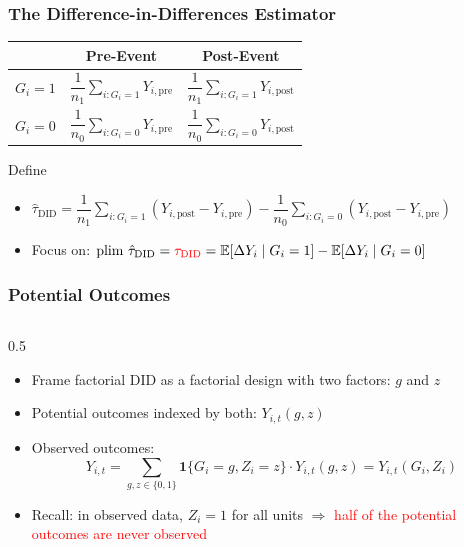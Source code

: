 \documentclass[xcolor=svgnames,9pt,english, aspectratio=169]{beamer}
\newcommand{\red}{\textcolor{red}}
\newcommand{\E}{\ensuremath{\mathbb{E}}}
\newcommand{\tdid}{\ensuremath{\tau_{\mathrm{DID}}}}
\newcommand{\tdidhat}{\ensuremath{\hat{\tau}_{\mathrm{DID}}}}
\newcommand{\pre}{\mathrm{pre}}
\newcommand{\post}{\mathrm{post}}
\newcommand{\potree}[1]{%
\begin{tikzpicture}[x=1cm,y=1cm, font=\footnotesize]
\node[font=\footnotesize\bfseries] at (3.35,3.0) {Pre-Event};
\node[font=\footnotesize\bfseries] at (5.15,3.0) {Post-Event};
\node (root) at (0.1,0) {Unit $i$};
\draw[densely dotted, thick] (0.55,0.15) -- (1.55,1.65);
\draw[densely dotted, thick] (0.55,-0.15) -- (1.55,-1.65);
\node at (0.72,1.22)  {$g=1$};
\node at (0.72,-1.22) {$g=0$};
\draw[densely dotted, thick] (1.6,1.75) -- (2.45,2.3);
\draw[densely dotted, thick] (1.6,1.75) -- (2.45,1.15);
\draw[densely dotted, thick] (1.6,-1.75) -- (2.45,-1.2);
\draw[densely dotted, thick] (1.6,-1.75) -- (2.45,-2.35);
\node at (1.95,2.25)  {$z=1$};
\node at (1.95,1.15)  {$z=0$};
\node at (1.95,-1.2)  {$z=1$};
\node at (1.95,-2.35) {$z=0$};
\node at (3.35,2.35)  {$Y_{i,\pre}(1,1)$};
\node[red] at (3.35,1.15)  {$Y_{i,\pre}(1,0)$};
\node at (3.35,-1.2)  {$Y_{i,\pre}(0,1)$};
\node[red] at (3.35,-2.35) {$Y_{i,\pre}(0,0)$};
\node at (5.15,2.35)  {$Y_{i,\post}(1,1)$};
\node[red] at (5.15,1.15)  {$Y_{i,\post}(1,0)$};
\node at (5.15,-1.2)  {$Y_{i,\post}(0,1)$};
\node[red] at (5.15,-2.35) {$Y_{i,\post}(0,0)$};
\if#11
\draw[decorate,decoration={brace,amplitude=4pt}] (5.95,2.5) -- (5.95,1.0)
  node[midway,right=5pt] {$\tau_{i,Z|G=1}$};
\draw[decorate,decoration={brace,amplitude=4pt}] (5.95,-1.05) -- (5.95,-2.5)
  node[midway,right=5pt] {$\tau_{i,Z|G=0}$};
\draw[decorate,decoration={brace,amplitude=5pt}] (7.6,2.0) -- (7.6,-2.0)
  node[midway,right=6pt] {$\tau_{i,\mathrm{cm}}$};
\fi
\end{tikzpicture}}
\begin{document}
\begin{frame}
  \frametitle{The Difference-in-Differences Estimator}
\begin{center}
\renewcommand{\arraystretch}{2.1}
\begin{tabular}{c|cc}
 & \textbf{Pre-Event} & \textbf{Post-Event} \\ \hline
$G_i = 1$ & $\dfrac{1}{n_1}\displaystyle\sum_{i: G_i=1} Y_{i,\pre}$ & $\dfrac{1}{n_1}\displaystyle\sum_{i: G_i=1} Y_{i,\post}$ \\
$G_i = 0$ & $\dfrac{1}{n_0}\displaystyle\sum_{i: G_i=0} Y_{i,\pre}$ & $\dfrac{1}{n_0}\displaystyle\sum_{i: G_i=0} Y_{i,\post}$ \\
\end{tabular}
\end{center}
\bigskip\pause
Define
\begin{itemize}\itemsep0.7em
\item $\tdidhat = \dfrac{1}{n_1}\displaystyle\sum_{i: G_i=1}\left(Y_{i,\post} - Y_{i,\pre}\right) - \dfrac{1}{n_0}\displaystyle\sum_{i: G_i=0}\left(Y_{i,\post} - Y_{i,\pre}\right)$\pause
\item Focus on: $\text{plim }\tdidhat = \red{\tdid} = \E[\Delta Y_i \mid G_i = 1] - \E[\Delta Y_i \mid G_i = 0]$
\end{itemize}
\end{frame}

\begin{frame}
  \frametitle{Potential Outcomes}
\begin{columns}[T,onlytextwidth]
\begin{column}{0.5\textwidth}
\begin{itemize}[<+->]\itemsep0.9em
\item Frame factorial DID as a factorial design with two factors: $g$ and $z$
\item Potential outcomes indexed by both: $Y_{i,t}(g,z)$
\item Observed outcomes:
$$Y_{i,t} = \sum_{g,z \in \{0,1\}} \mathbf{1}\{G_i = g, Z_i = z\} \cdot Y_{i,t}(g,z) = Y_{i,t}(G_i, Z_i)$$
\item Recall: in observed data, $Z_i = 1$ for all units
$\Rightarrow$ \red{half of the potential outcomes are never observed}
\end{itemize}
\end{column}
\end{columns}
\end{frame}
\end{document}
